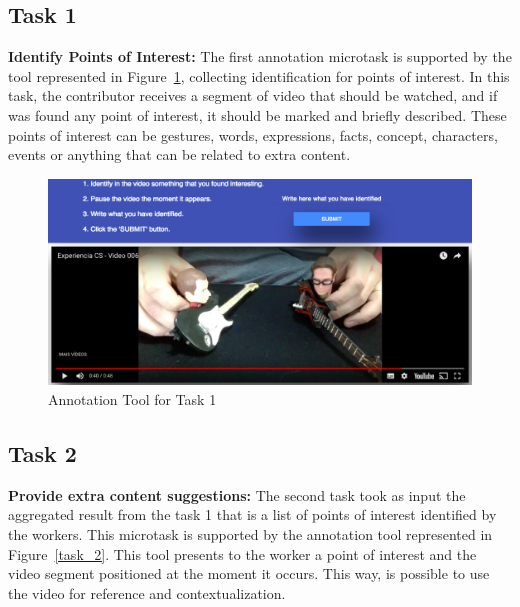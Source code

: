 \subsection{Task 1}
\textbf{Identify Points of Interest:} The first annotation microtask is supported by the tool represented in Figure~\ref{task_1}, collecting identification for points of interest. In this task, the contributor receives a segment of video that should be watched, and if was found any point of interest, it should be marked and briefly described. These points of interest can be gestures, words, expressions, facts, concept, characters, events or anything that can be related to extra content.


\begin{figure}[h!]
	\centerline{\includegraphics[scale=0.20] {figure/task_1_new}}
	\caption{Annotation Tool for Task 1}
	\label{task_1}
\end{figure}


\subsection{Task 2}

\textbf{Provide extra content suggestions:} The second task took as input the aggregated result from the task 1 that is a list of points of interest identified by the workers. This microtask is supported by the annotation tool represented in Figure~\ref{task_2}. This tool presents to the worker a point of interest and the video segment positioned at the moment it occurs. This way, is possible to use the video for reference and contextualization.


